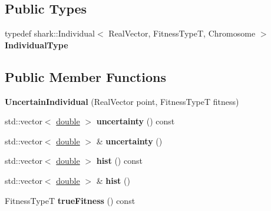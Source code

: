 \subsection*{Public Types}
\begin{DoxyCompactItemize}
\item 
typedef shark\+::\+Individual$<$ Real\+Vector, Fitness\+TypeT, Chromosome $>$ {\bfseries Individual\+Type}\hypertarget{classUncertainIndividual_a12fd86b7482c1ea80ae0498388342e42}{}\label{classUncertainIndividual_a12fd86b7482c1ea80ae0498388342e42}

\end{DoxyCompactItemize}
\subsection*{Public Member Functions}
\begin{DoxyCompactItemize}
\item 
{\bfseries Uncertain\+Individual} (Real\+Vector point, Fitness\+TypeT fitness)\hypertarget{classUncertainIndividual_aeece1d786516a7f65d0a50716571c114}{}\label{classUncertainIndividual_aeece1d786516a7f65d0a50716571c114}

\item 
std\+::vector$<$ \hyperlink{classdouble}{double} $>$ {\bfseries uncertainty} () const \hypertarget{classUncertainIndividual_a0e20155ab98c59245a6690dd7547af6d}{}\label{classUncertainIndividual_a0e20155ab98c59245a6690dd7547af6d}

\item 
std\+::vector$<$ \hyperlink{classdouble}{double} $>$ \& {\bfseries uncertainty} ()\hypertarget{classUncertainIndividual_a22397a043ec2aecd60187607bd18fc0e}{}\label{classUncertainIndividual_a22397a043ec2aecd60187607bd18fc0e}

\item 
std\+::vector$<$ \hyperlink{classdouble}{double} $>$ {\bfseries hist} () const \hypertarget{classUncertainIndividual_a585493af656ea988700dd07aed8fd2a5}{}\label{classUncertainIndividual_a585493af656ea988700dd07aed8fd2a5}

\item 
std\+::vector$<$ \hyperlink{classdouble}{double} $>$ \& {\bfseries hist} ()\hypertarget{classUncertainIndividual_abcf3e0216bb531bac45ffc9120bd70ad}{}\label{classUncertainIndividual_abcf3e0216bb531bac45ffc9120bd70ad}

\item 
Fitness\+TypeT {\bfseries true\+Fitness} () const \hypertarget{classUncertainIndividual_aa74b8567f6920c1435a329890c539972}{}\label{classUncertainIndividual_aa74b8567f6920c1435a329890c539972}


\end{DoxyCompactItemize}
